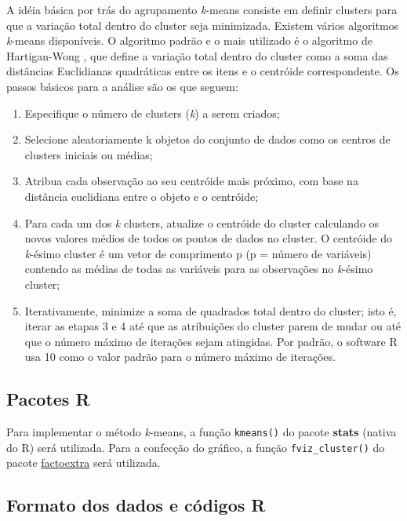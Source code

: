 \documentclass[
]{book}
\providecommand{\tightlist}{%
  \setlength{\itemsep}{0pt}\setlength{\parskip}{0pt}}
\begin{document}
A idéia básica por trás do agrupamento  \emph{k}-means consiste em definir clusters para que a variação total dentro do cluster seja minimizada. Existem vários algoritmos \emph{k}-means disponíveis. O algoritmo padrão e o mais utilizado é o algoritmo de Hartigan-Wong \citep{Hartigan1979}, que define a variação total dentro do cluster como a soma das distâncias Euclidianas quadráticas entre os itens e o centróide correspondente. Os passos básicos para a análise são os que seguem:

\begin{enumerate}
\def\labelenumi{\arabic{enumi}.}
\tightlist
\item
  Especifique o número de clusters (\emph{k}) a serem criados;
\item
  Selecione aleatoriamente k objetos do conjunto de dados como os centros de clusters iniciais ou médias;
\item
  Atribua cada observação ao seu centróide mais próximo, com base na distância euclidiana entre o objeto e o centróide;
\item
  Para cada um dos \emph{k} clusters, atualize o centróide do cluster calculando os novos valores médios de todos os pontos de dados no cluster. O centróide do \emph{k}-ésimo cluster é um vetor de comprimento p (p = número de variáveis) contendo as médias de todas as variáveis para as observações no \emph{k}-ésimo cluster;
\item
  Iterativamente, minimize a soma de quadrados total dentro do cluster; isto é, iterar as etapas 3 e 4 até que as atribuições do cluster parem de mudar ou até que o número máximo de iterações sejam atingidas. Por padrão, o software R usa 10 como o valor padrão para o número máximo de iterações.
\end{enumerate}

\hypertarget{pacotes-r-1}{%
\subsection{Pacotes R}\label{pacotes-r-1}}

Para implementar o método \emph{k}-means, a função \texttt{kmeans()} do pacote \textbf{stats} (nativa do R) será utilizada. Para a confecção do gráfico, a função \texttt{fviz\_cluster()}  do pacote \href{https://rpkgs.datanovia.com/factoextra/index.html}{factoextra} será utilizada.

\hypertarget{formato-dos-dados-e-cuxf3digos-r}{%
\subsection{Formato dos dados e códigos R}\label{formato-dos-dados-e-cuxf3digos-r}}
\end{document}

